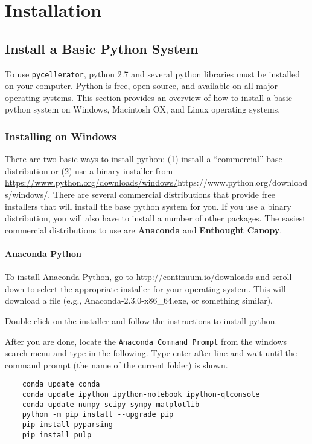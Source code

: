 
\chapter{Installation}

\section[Install Python]{Install a Basic Python System}

To use {\tt pycellerator}, python 2.7 and several python libraries must be installed on your computer. Python is free, open source, and available on all major operating systems.  This section provides an overview of how to install a basic python system on Windows, Macintosh OX, and Linux operating systems. 

\subsection{Installing on Windows}

There are two basic ways to install python: (1) install a ``commercial'' base distribution or (2) use a binary installer from  \url{https://www.python.org/downloads/windows/}{https://www.python.org/downloads/windows/}. There are several commercial distributions that provide free installers that will install the base python system for you. If you use a binary distribution, you will also have to install a number of other packages. The easiest commercial distributions to use are \textbf{Anaconda} and \textbf{Enthought Canopy}. 

\subsubsection{Anaconda Python}

To install Anaconda Python, go to \href{http://continuum.io/downloads}{http://continuum.io/downloads} and scroll down to select the appropriate installer for your operating system. This will download a file (e.g., Anaconda-2.3.0-x86\_64.exe, or something similar). 

Double click on the installer and follow the instructions to install python. 

After you are done, locate the {\tt Anaconda Command Prompt} from the windows search menu and type in the following. Type enter after line and wait until the command prompt (the name of the current folder)  is shown. 
\begin{lstlisting}
    conda update conda
    conda update ipython ipython-notebook ipython-qtconsole
    conda update numpy scipy sympy matplotlib
    python -m pip install --upgrade pip
    pip install pyparsing
    pip install pulp
\end{lstlisting}

